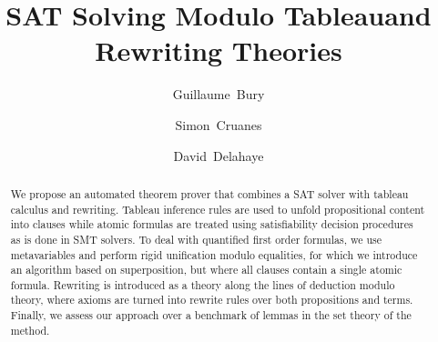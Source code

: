 \documentclass[orivec]{llncs}
\begin{document}
\title{SAT Solving Modulo Tableau\break{}and Rewriting Theories}

\author{Guillaume~Bury \and Simon~Cruanes \and
David~Delahaye}


\maketitle

\begin{abstract}
We propose an automated theorem prover that combines a SAT solver with tableau
calculus and rewriting. Tableau inference rules are used to unfold propositional
content into clauses while atomic formulas are treated using satisfiability
decision procedures as is done in SMT solvers. To deal with quantified first
order formulas, we use metavariables and perform rigid unification modulo
equalities, for which we introduce an algorithm based on superposition, but
where all clauses contain a single atomic formula. Rewriting is introduced as a
theory along the lines of deduction modulo theory, where axioms are turned into
rewrite rules over both propositions and terms.  Finally, we assess our approach
over a benchmark of lemmas in the set theory of the \bmth{} method.

\end{abstract}









\end{document}
